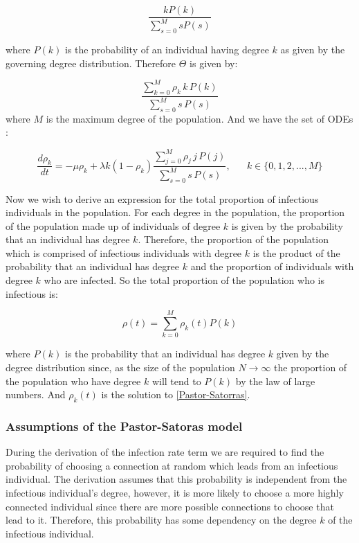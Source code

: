 \documentclass{uonmathsreport}
\begin{document}
\begin{equation}
\frac{kP(k)}{\sum_{s=0}^{M}sP(s)}
\label{Prob of degree k}
\end{equation}

\bigskip
\noindent
where $P(k)$ is the probability of an individual having degree $k$ as given by the governing degree distribution. Therefore $\Theta$ is given by:

\begin{equation}
\frac{\sum_{k=0}^{M}\rho_{k}\,k\,P(k)}{\sum_{s=0}^{M}s\,P(s)}
\label{THETA}
\end{equation}
\noindent
where $M$ is the maximum degree of the population.
And we have the set of ODEs :

\begin{equation} \label{Pastor-Satorras}
\frac{d\rho_{k}}{dt}=-\mu\rho_{k}+\lambda k (1-\rho_{k})\frac{\sum_{j=0}^{M}\rho_{j}\,j\,P(j)}{\sum_{s=0}^{M}s\,P(s)},\,\,\,\,\,\,\,\,\,\,k \in \{0,1,2,...,M\}
\end{equation}

Now we wish to derive an expression for the total proportion of infectious individuals in the population. For each degree in the population, the proportion of the population made up of individuals of degree $k$ is given by the probability that an individual has degree $k$. Therefore, the proportion of the population which is comprised of infectious individuals with degree $k$ is the product of the probability that an individual has degree $k$ and the proportion of individuals with degree $k$ who are infected. So the total proportion of the population who is infectious is:

\begin{equation}
\rho (t)=\sum_{k=0}^{M}\rho_{k}(t)P(k)
\label{Pastor sum}
\end{equation}

where $P(k)$ is the probability that an individual has degree $k$ given by the degree distribution since, as the size of the population $N\rightarrow\infty$ the proportion of the population who have degree $k$ will tend to $P(k)$ by the law of large numbers. And $\rho_{k}(t)$ is the solution to \eqref{Pastor-Satorras}. 

\subsubsection{Assumptions of the Pastor-Satoras model} \label{subsub:6.1.2}
\indent
During the derivation of the infection rate term we are required to find the probability of choosing a connection at random which leads from an infectious individual. The derivation assumes that this probability is independent from the infectious individual's degree, however, it is more likely to choose a more highly connected individual since there are more possible connections to choose that lead to it. Therefore, this probability has some dependency on the degree $k$ of the infectious individual.
\end{document}
